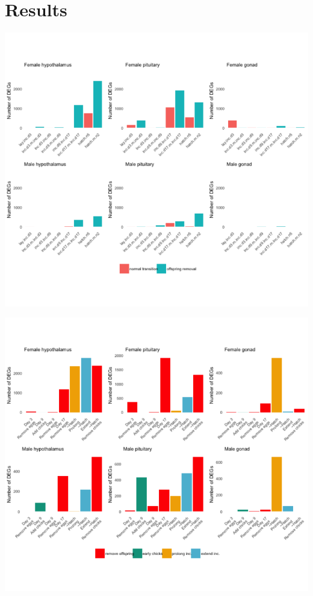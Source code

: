 \documentclass[10pt,letterpaper]{article}
\begin{document}
\hypertarget{results}{%
\section{Results}\label{results}}

\includegraphics{manipulation_manuscript_files/figure-latex/unnamed-chunk-2-1.pdf}

\includegraphics{manipulation_manuscript_files/figure-latex/unnamed-chunk-3-1.pdf}
\end{document}
